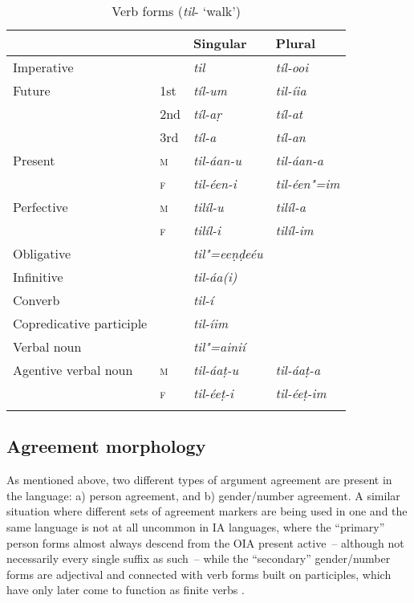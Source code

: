 \begin{table}[ht]
\caption{Verb forms (\textit{til}- `walk')}

\begin{tabularx}{\textwidth}{ Q l@{\hspace{20pt}} l@{\hspace{20pt}} l@{\hspace{20pt}} }
\lsptoprule
&
&
Singular &
Plural\\\midrule
Imperative &
&
\textit{til} &
\textit{tíl-ooi} \\
Future &
1st &
\textit{tíl-um} &
\textit{til-íia} \\
&
2nd &
\textit{tíl-aṛ} &
\textit{tíl-at} \\
&
3rd &
\textit{tíl-a} &
\textit{tíl-an} \\
Present &
\textsc{m} &
\textit{til-áan-u} &
\textit{til-áan-a} \\
&
\textsc{f} &
\textit{til-éen-i} &
\textit{til-éen"=im} \\
Perfective &
\textsc{m} &
\textit{tilíl-u} &
\textit{tilíl-a} \\
&
\textsc{f} &
\textit{tilíl-i} &
\textit{tilíl-im} \\
Obligative &
&
\textit{til"=eeṇḍeéu} &
\\
Infinitive &
&
\textit{til-áa(i)} &
\\
Converb &
&
\textit{til-í} &
\\
Copredicative participle &
&
\textit{til-íim} &
\\
Verbal noun &
&
\textit{til"=ainií} &
\\
Agentive verbal noun &
\textsc{m} &
\textit{til-áaṭ-u} &
\textit{til-áaṭ-a} \\
&
\textsc{f} &
\textit{til-éeṭ-i} &
\textit{til-éeṭ-im} 
\\\lspbottomrule
\end{tabularx}
\label{tab:8-15}
\end{table}


\subsection{Agreement morphology}
\label{subsec:8-4-1}

As mentioned above, two different types of argument agreement are present in the language: a) person agreement, and b) gender/number agreement. A similar situation where different sets of agreement markers are being used in one and the same language is not at all uncommon in IA languages, where the ``primary'' person forms almost always descend from the OIA present active~-- although not necessarily every single suffix as such~-- while the ``secondary'' gender/number forms are adjectival and connected with verb forms built on participles, which have only later come to function as finite verbs \citep[259--260]{masica1991}. 



